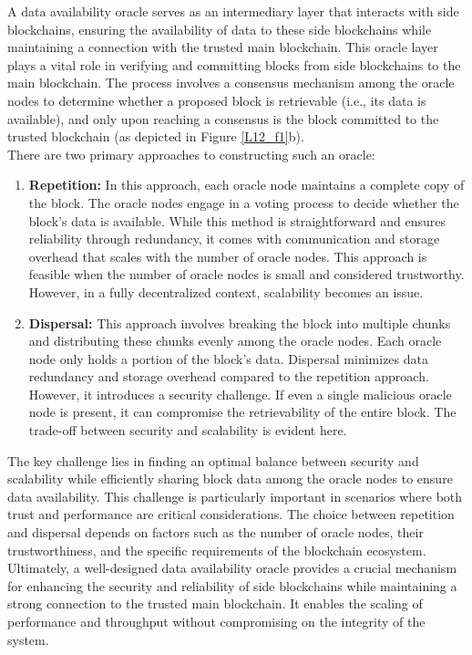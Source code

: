 A data availability oracle serves as an intermediary layer that interacts with side blockchains, ensuring the availability of data to these side blockchains while maintaining a connection with the trusted main blockchain. This oracle layer plays a vital role in verifying and committing blocks from side blockchains to the main blockchain. The process involves a consensus mechanism among the oracle nodes to determine whether a proposed block is retrievable (i.e., its data is available), and only upon reaching a consensus is the block committed to the trusted blockchain (as depicted in Figure \ref{L12_f1}b).\\
There are two primary approaches to constructing such an oracle:
\begin{enumerate}
	\item \textbf{Repetition:} In this approach, each oracle node maintains a complete copy of the block. The oracle nodes engage in a voting process to decide whether the block's data is available. While this method is straightforward and ensures reliability through redundancy, it comes with communication and storage overhead that scales with the number of oracle nodes. This approach is feasible when the number of oracle nodes is small and considered trustworthy. However, in a fully decentralized context, scalability becomes an issue.
	\item \textbf{Dispersal:} This approach involves breaking the block into multiple chunks and distributing these chunks evenly among the oracle nodes. Each oracle node only holds a portion of the block's data. Dispersal minimizes data redundancy and storage overhead compared to the repetition approach. However, it introduces a security challenge. If even a single malicious oracle node is present, it can compromise the retrievability of the entire block. The trade-off between security and scalability is evident here.
\end{enumerate}
The key challenge lies in finding an optimal balance between security and scalability while efficiently sharing block data among the oracle nodes to ensure data availability. This challenge is particularly important in scenarios where both trust and performance are critical considerations. The choice between repetition and dispersal depends on factors such as the number of oracle nodes, their trustworthiness, and the specific requirements of the blockchain ecosystem.\\
Ultimately, a well-designed data availability oracle provides a crucial mechanism for enhancing the security and reliability of side blockchains while maintaining a strong connection to the trusted main blockchain. It enables the scaling of performance and throughput without compromising on the integrity of the system.

